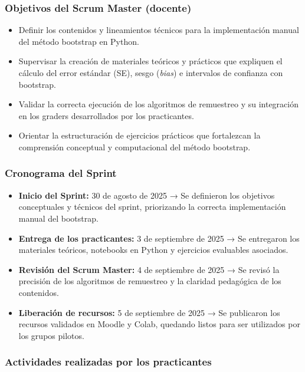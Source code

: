 \documentclass[letter,oneside,12pt,spanish]{report}
\begin{document}
\subsubsection*{Objetivos del Scrum Master (docente)}
\begin{itemize}
	\item Definir los contenidos y lineamientos técnicos para la implementación manual del método bootstrap en Python.
	\item Supervisar la creación de materiales teóricos y prácticos que expliquen el cálculo del error estándar (SE), sesgo (\textit{bias}) e intervalos de confianza con bootstrap.
	\item Validar la correcta ejecución de los algoritmos de remuestreo y su integración en los graders desarrollados por los practicantes.
	\item Orientar la estructuración de ejercicios prácticos que fortalezcan la comprensión conceptual y computacional del método bootstrap.
\end{itemize}

\subsubsection*{Cronograma del Sprint}
\begin{itemize}
	\item \textbf{Inicio del Sprint:} 30 de agosto de 2025 → Se definieron los objetivos conceptuales y técnicos del sprint, priorizando la correcta implementación manual del bootstrap.
	\item \textbf{Entrega de los practicantes:} 3 de septiembre de 2025 → Se entregaron los materiales teóricos, notebooks en Python y ejercicios evaluables asociados.
	\item \textbf{Revisión del Scrum Master:} 4 de septiembre de 2025 → Se revisó la precisión de los algoritmos de remuestreo y la claridad pedagógica de los contenidos.
	\item \textbf{Liberación de recursos:} 5 de septiembre de 2025 → Se publicaron los recursos validados en Moodle y Colab, quedando listos para ser utilizados por los grupos pilotos.
\end{itemize}

\subsubsection*{Actividades realizadas por los practicantes}
\end{document}
